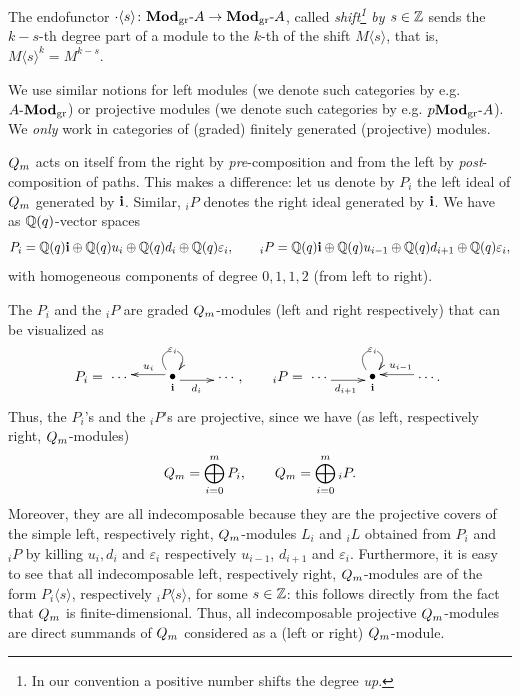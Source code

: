 The endofunctor $\cdot\langle s\rangle\colon\boldsymbol{\mathrm{Mod}}_{\mathrm{gr}}\text{-}A\to\boldsymbol{\mathrm{Mod}}_{\mathrm{gr}}\text{-}A$, 
called \textit{shift\footnote{In our convention a positive number shifts the degree \textit{up}.} 
by $s\in\mathbb{Z}$} sends the $k-s$-th degree part of a module to the 
$k$-th of the shift $M\langle s\rangle$, that is, $M\langle s\rangle^k=M^{k-s}$.



We use similar notions for left modules 
(we denote such categories by e.g. $A\text{-}\boldsymbol{\mathrm{Mod}}_{\mathrm{gr}}$) 
or projective modules (we denote such categories 
by e.g. $p\boldsymbol{\mathrm{Mod}}_{\mathrm{gr}}\text{-}A$). We \textit{only} 
work in categories of (graded) finitely generated (projective) modules.



$Q_{m}$ acts on itself from the right 
by \textit{pre}-composition and from the 
left by \textit{post}-composition of paths.
This makes a difference: 
let us denote by $P_i$ the 
left ideal of $Q_{m}$ generated 
by $\boldsymbol{\mathrm{i}}$. Similar, ${}_iP$ denotes 
the right ideal generated by $\boldsymbol{\mathrm{i}}$. We have as $\mathbb{Q}(q)$-vector spaces
\[
P_i=\mathbb{Q}(q)\boldsymbol{\mathrm{i}}\oplus\mathbb{Q}(q) u_i\oplus\mathbb{Q}(q) d_i\oplus\mathbb{Q}(q)\varepsilon_i,\quad\quad{}_iP=\mathbb{Q}(q)\boldsymbol{\mathrm{i}}\oplus\mathbb{Q}(q) u_{i-1}\oplus\mathbb{Q}(q) d_{i+1}\oplus\mathbb{Q}(q)\varepsilon_i,
\]
with homogeneous components of degree $0,1,1,2$ (from left to right).




The $P_i$ and the ${}_iP$ are graded 
$Q_{m}$-modules (left and right respectively) that can be visualized as
\[
P_i=\xymatrix{
  \cdots  & \raisebox{0.1cm}{\xy(0,0)*{\bullet};(0,-2.5)*{\scriptstyle \bbi};\endxy}\ar@(ul,ur)|{\varepsilon_i}  \ar@<-2pt>[l]_/-0.2em/{u_i}\ar@<-2pt>[r]_/-0.2em/{d_i} &\cdots \\
},\quad\quad{}_iP=\xymatrix{
   \cdots \ar@<-2pt>[r]_{d_{i+1}} & \raisebox{0.1cm}{\xy(0,0)*{\bullet};(0,-2.5)*{\scriptstyle \bbi};\endxy}\ar@(ul,ur)|{\varepsilon_i}   &\cdots \ar@<-2pt>[l]_{u_{i-1}}.\\
}
\]
Thus, the $P_i$'s and the ${}_iP$'s 
are projective, since we have (as left, respectively right, $Q_{m}$-modules)
\[
Q_{m}=\bigoplus_{i=0}^m P_i,\quad\quad Q_{m}=\bigoplus_{i=0}^m {}_iP.
\]
Moreover, they are all indecomposable because 
they are the projective covers of the simple left, respectively right, $Q_{m}$-modules $L_i$ 
and ${}_iL$ 
obtained from $P_i$ 
and ${}_iP$ by killing $u_i,d_i$ and $\varepsilon_i$ 
respectively $u_{i-1}$, $d_{i+1}$ and $\varepsilon_i$.
Furthermore, it is easy to see that all 
indecomposable left, respectively right, 
$Q_{m}$-modules are of the form $P_i\langle s\rangle$, 
respectively ${}_iP\langle s\rangle$, for some $s\in\mathbb{Z}$: 
this follows directly from the fact that $Q_{m}$ is 
finite-dimensional. Thus, all indecomposable projective $Q_{m}$-modules are 
direct summands of $Q_{m}$ considered as a (left or right) $Q_{m}$-module.





